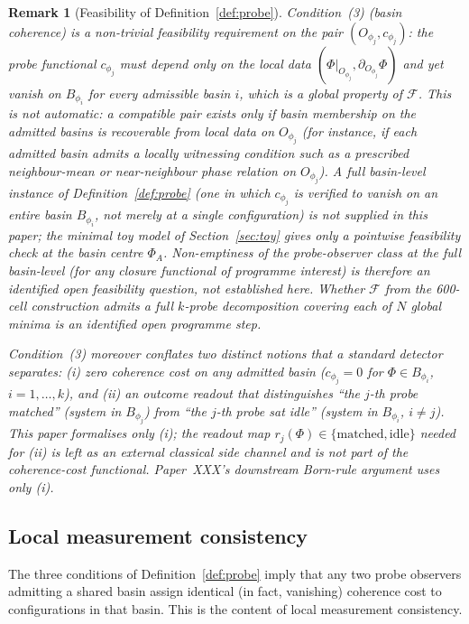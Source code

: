 \documentclass[12pt]{article}
\newtheorem{remark}[theorem]{Remark}
\newcommand{\Fcal}{\mathcal{F}}
\begin{document}
\begin{remark}[Feasibility of Definition~\ref{def:probe}]\label{rem:probe_feasibility}
Condition~(3) (basin coherence) is a non-trivial feasibility requirement on the pair $(O_{\phi_j}, c_{\phi_j})$: the probe functional $c_{\phi_j}$ must depend only on the local data $(\Phi|_{O_{\phi_j}}, \partial_{O_{\phi_j}}\Phi)$ and yet vanish on $B_{\phi_i}$ for every admissible basin $i$, which is a global property of $\Fcal$. This is not automatic: a compatible pair exists only if basin membership on the admitted basins is recoverable from local data on $O_{\phi_j}$ (for instance, if each admitted basin admits a locally witnessing condition such as a prescribed neighbour-mean or near-neighbour phase relation on $O_{\phi_j}$). A full basin-level instance of Definition~\ref{def:probe} (one in which $c_{\phi_j}$ is verified to vanish on an entire basin $B_{\phi_i}$, not merely at a single configuration) is not supplied in this paper; the minimal toy model of Section~\ref{sec:toy} gives only a pointwise feasibility check at the basin centre $\Phi_A$. Non-emptiness of the probe-observer class at the full basin-level (for any closure functional of programme interest) is therefore an identified open feasibility question, not established here. Whether $\Fcal$ from the 600-cell construction admits a full $k$-probe decomposition covering each of $N$ global minima is an identified open programme step.

Condition~(3) moreover conflates two distinct notions that a standard detector separates: (i) \emph{zero coherence cost} on any admitted basin ($c_{\phi_j} = 0$ for $\Phi \in B_{\phi_i}$, $i = 1, \ldots, k$), and (ii) an \emph{outcome readout} that distinguishes ``the $j$-th probe matched'' (system in $B_{\phi_j}$) from ``the $j$-th probe sat idle'' (system in $B_{\phi_i}$, $i \neq j$). This paper formalises only (i); the readout map $r_j(\Phi) \in \{\text{matched}, \text{idle}\}$ needed for (ii) is left as an external classical side channel and is not part of the coherence-cost functional. Paper~XXX's downstream Born-rule argument uses only (i).
\end{remark}

\subsection{Local measurement consistency}\label{subsec:lmc}

The three conditions of Definition~\ref{def:probe} imply that any two probe observers admitting a shared basin assign identical (in fact, vanishing) coherence cost to configurations in that basin. This is the content of local measurement consistency.
\end{document}
